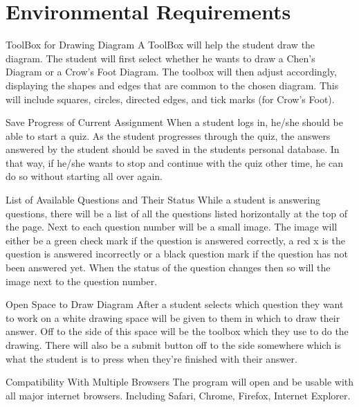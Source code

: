 \chapter{Environmental Requirements}


    \begin{section}{ToolBox for Drawing Diagram}
    A ToolBox will help the student draw the diagram. The student will first select whether he wants to draw a Chen’s Diagram or a Crow’s Foot Diagram. The toolbox will then adjust accordingly, displaying the shapes and edges that are common to the chosen diagram. This will include squares, circles, directed edges, and tick marks (for Crow’s Foot).
    
    \end{section}
    
    \begin{section}{Save Progress of Current Assignment}
    When a student logs in, he/she should be able to start a quiz. As the student progresses through the quiz, the answers answered by the student should be saved in the students personal database. In that way, if he/she wants to stop and continue with the quiz other time, he can do so without starting all over again.
    \end{section}
    
    \begin{section}{List of Available Questions and Their Status}
    While a student is answering questions, there will be a list of all the questions listed horizontally at the top of the page.  Next to each question number will be a small image.  The image will either be a green check mark if the question is answered correctly, a red x is the question is answered incorrectly or a black question mark if the question has not been answered yet.  When the status of the question changes then so will the image next to the question number.
    \end{section}
    
    \begin{section}{Open Space to Draw Diagram}
    After a student selects which question they want to work on a white drawing space will be given to them in which to draw their answer. Off to the side of this space will be the toolbox which they use to do the drawing. There will also be a submit button off to the side somewhere which is what the student is to press when they're finished with their answer.
    \end{section}
    
    \begin{section}{Compatibility With Multiple Browsers}
    The program will open and be usable with all major internet browsers. Including Safari, Chrome, Firefox, Internet Explorer.
    \end{section}





